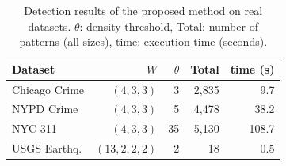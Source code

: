 \begin{table}[h]
\centering
\caption{Detection results of the proposed method on real datasets.
  $\theta$: density threshold,
  Total: number of patterns (all sizes),
  time: execution time (seconds).}
\label{tab:realdata_npatterns}
\small
\begin{tabular}{lrrrr}
\toprule
Dataset & $W$ & $\theta$ & Total & time (s) \\
\midrule
Chicago Crime  & $(4,3,3)$    &   3 & 2,835 &   9.7 \\
NYPD Crime     & $(4,3,3)$    &   5 & 4,478 &  38.2 \\
NYC 311        & $(4,3,3)$    &  35 & 5,130 & 108.7 \\
USGS Earthq.   & $(13,2,2,2)$ &   2 &    18 &   0.5 \\
\bottomrule
\end{tabular}
\end{table}
